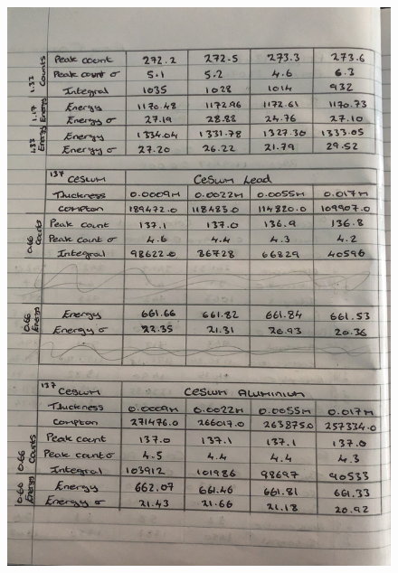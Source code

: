 \documentclass[12pt]{article}
\begin{document}
\begin{figure}[H]
\centering
\includegraphics[scale=0.175]{Images/IMG_0335.JPG}
\end{figure}
\newpage
\end{document}
